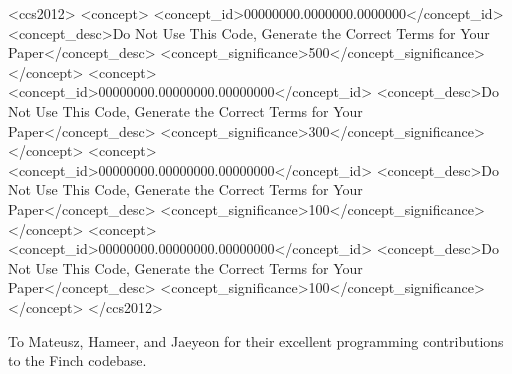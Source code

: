 \documentclass[acmsmall]{acmart}
\begin{document}
\begin{CCSXML}
<ccs2012>
 <concept>
  <concept_id>00000000.0000000.0000000</concept_id>
  <concept_desc>Do Not Use This Code, Generate the Correct Terms for Your Paper</concept_desc>
  <concept_significance>500</concept_significance>
 </concept>
 <concept>
  <concept_id>00000000.00000000.00000000</concept_id>
  <concept_desc>Do Not Use This Code, Generate the Correct Terms for Your Paper</concept_desc>
  <concept_significance>300</concept_significance>
 </concept>
 <concept>
  <concept_id>00000000.00000000.00000000</concept_id>
  <concept_desc>Do Not Use This Code, Generate the Correct Terms for Your Paper</concept_desc>
  <concept_significance>100</concept_significance>
 </concept>
 <concept>
  <concept_id>00000000.00000000.00000000</concept_id>
  <concept_desc>Do Not Use This Code, Generate the Correct Terms for Your Paper</concept_desc>
  <concept_significance>100</concept_significance>
 </concept>
</ccs2012>
\end{CCSXML}




\maketitle






\begin{acks}
    To Mateusz, Hameer, and Jaeyeon for their excellent programming contributions to the Finch codebase.
\end{acks}
\end{document}
